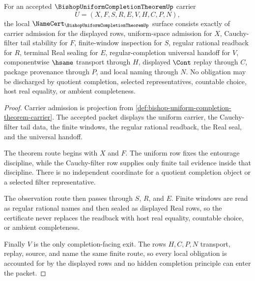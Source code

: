 \begin{theorem}
\label{thm:bishop-uniform-completion-theorem-namecert-obligations}
For an accepted $\BishopUniformCompletionTheoremUp$ carrier
$$
U=(X,F,S,R,E,V,H,C,P,N),
$$
the local $\NameCert_{\BishopUniformCompletionTheoremUp}$ surface consists exactly of carrier admission for the displayed rows, uniform-space admission for $X$, Cauchy-filter tail stability for $F$, finite-window inspection for $S$, regular rational readback for $R$, terminal Real sealing for $E$, regular-completion universal handoff for $V$, componentwise $\hsame$ transport through $H$, displayed $\Cont$ replay through $C$, package provenance through $P$, and local naming through $N$. No obligation may be discharged by quotient completion, selected representatives, countable choice, host real equality, or ambient completeness.
\end{theorem}
\begin{proof}
Carrier admission is projection from \autoref{def:bishop-uniform-completion-theorem-carrier}. The accepted packet displays the uniform carrier, the Cauchy-filter tail data, the finite windows, the regular rational readback, the Real seal, and the universal handoff.

The theorem route begins with $X$ and $F$. The uniform row fixes the entourage discipline, while the Cauchy-filter row supplies only finite tail evidence inside that discipline. There is no independent coordinate for a quotient completion object or a selected filter representative.

The observation route then passes through $S$, $R$, and $E$. Finite windows are read as regular rational names and then sealed as displayed Real rows, so the certificate never replaces the readback with host real equality, countable choice, or ambient completeness.

Finally $V$ is the only completion-facing exit. The rows $H,C,P,N$ transport, replay, source, and name the same finite route, so every local obligation is accounted for by the displayed rows and no hidden completion principle can enter the packet.
\end{proof}

